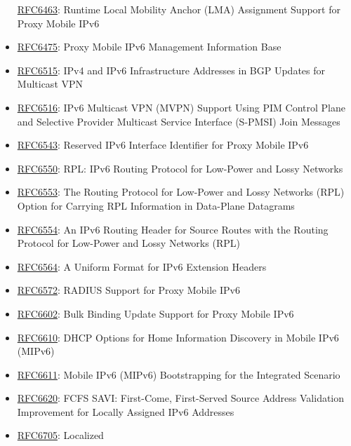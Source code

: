 \documentclass[
]{article}
\begin{document}
\begin{itemize}
  \href{https://www.rfc-editor.org/info/rfc6463}{RFC6463}: Runtime Local
  Mobility Anchor (LMA) Assignment Support for Proxy Mobile IPv6
\item
  \href{https://www.rfc-editor.org/info/rfc6475}{RFC6475}: Proxy Mobile
  IPv6 Management Information Base
\item
  \href{https://www.rfc-editor.org/info/rfc6515}{RFC6515}: IPv4 and IPv6
  Infrastructure Addresses in BGP Updates for Multicast VPN
\item
  \href{https://www.rfc-editor.org/info/rfc6516}{RFC6516}: IPv6
  Multicast VPN (MVPN) Support Using PIM Control Plane and Selective
  Provider Multicast Service Interface (S-PMSI) Join Messages
\item
  \href{https://www.rfc-editor.org/info/rfc6543}{RFC6543}: Reserved IPv6
  Interface Identifier for Proxy Mobile IPv6
\item
  \href{https://www.rfc-editor.org/info/rfc6550}{RFC6550}: RPL: IPv6
  Routing Protocol for Low-Power and Lossy Networks
\item
  \href{https://www.rfc-editor.org/info/rfc6553}{RFC6553}: The Routing
  Protocol for Low-Power and Lossy Networks (RPL) Option for Carrying
  RPL Information in Data-Plane Datagrams
\item
  \href{https://www.rfc-editor.org/info/rfc6554}{RFC6554}: An IPv6
  Routing Header for Source Routes with the Routing Protocol for
  Low-Power and Lossy Networks (RPL)
\item
  \href{https://www.rfc-editor.org/info/rfc6564}{RFC6564}: A Uniform
  Format for IPv6 Extension Headers
\item
  \href{https://www.rfc-editor.org/info/rfc6572}{RFC6572}: RADIUS
  Support for Proxy Mobile IPv6
\item
  \href{https://www.rfc-editor.org/info/rfc6602}{RFC6602}: Bulk Binding
  Update Support for Proxy Mobile IPv6
\item
  \href{https://www.rfc-editor.org/info/rfc6610}{RFC6610}: DHCP Options
  for Home Information Discovery in Mobile IPv6 (MIPv6)
\item
  \href{https://www.rfc-editor.org/info/rfc6611}{RFC6611}: Mobile IPv6
  (MIPv6) Bootstrapping for the Integrated Scenario
\item
  \href{https://www.rfc-editor.org/info/rfc6620}{RFC6620}: FCFS SAVI:
  First-Come, First-Served Source Address Validation Improvement for
  Locally Assigned IPv6 Addresses
\item
  \href{https://www.rfc-editor.org/info/rfc6705}{RFC6705}: Localized

\end{itemize}
\end{document}
